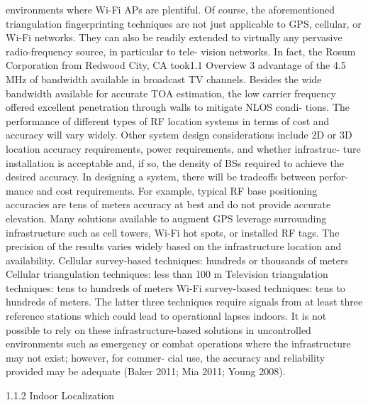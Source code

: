environments where Wi-Fi APs are plentiful.
Of course, the aforementioned triangulation fingerprinting techniques are not
just applicable to GPS, cellular, or Wi-Fi networks. They can also be readily
extended to virtually any pervasive radio-frequency source, in particular to tele-
vision networks. In fact, the Rosum Corporation from Redwood City, CA took1.1 Overview
3
advantage of the 4.5 MHz of bandwidth available in broadcast TV channels.
Besides the wide bandwidth available for accurate TOA estimation, the low carrier
frequency offered excellent penetration through walls to mitigate NLOS condi-
tions. The performance of different types of RF location systems in terms of cost
and accuracy will vary widely. Other system design considerations include 2D or
3D location accuracy requirements, power requirements, and whether infrastruc-
ture installation is acceptable and, if so, the density of BSs required to achieve the
desired accuracy. In designing a system, there will be tradeoffs between perfor-
mance and cost requirements. For example, typical RF base positioning accuracies
are tens of meters accuracy at best and do not provide accurate elevation. Many
solutions available to augment GPS leverage surrounding infrastructure such as
cell towers, Wi-Fi hot spots, or installed RF tags. The precision of the results
varies widely based on the infrastructure location and availability.
Cellular survey-based techniques: hundreds or thousands of meters
Cellular triangulation techniques: less than 100 m
Television triangulation techniques: tens to hundreds of meters
Wi-Fi survey-based techniques: tens to hundreds of meters.
The latter three techniques require signals from at least three reference stations
which could lead to operational lapses indoors. It is not possible to rely on these
infrastructure-based solutions in uncontrolled environments such as emergency or
combat operations where the infrastructure may not exist; however, for commer-
cial use, the accuracy and reliability provided may be adequate (Baker 2011; Mia
2011; Young 2008).


1.1.2 Indoor Localization


